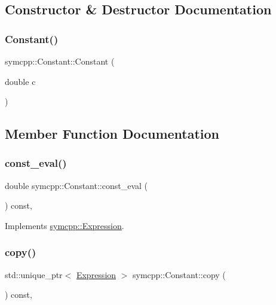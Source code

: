 \subsection{Constructor \& Destructor Documentation}
\mbox{\label{classsymcpp_1_1Constant_a634c91ce129b22e1b9b9afe13d4c8753}} 
\subsubsection{\texorpdfstring{Constant()}{Constant()}}
{\footnotesize\ttfamily symcpp\+::\+Constant\+::\+Constant (\begin{DoxyParamCaption}\item[{double}]{c }\end{DoxyParamCaption})}



\subsection{Member Function Documentation}
\mbox{\label{classsymcpp_1_1Constant_a9c2a9089ae171c2403e053a566929b45}} 
\subsubsection{\texorpdfstring{const\_eval()}{const\_eval()}}
{\footnotesize\ttfamily double symcpp\+::\+Constant\+::const\+\_\+eval (\begin{DoxyParamCaption}{ }\end{DoxyParamCaption}) const\hspace{0.3cm}{\ttfamily [override]}, {\ttfamily [virtual]}}



Implements \mbox{\hyperlink{classsymcpp_1_1Expression_a81c8069347f586cb5632338d97c278ad}{symcpp\+::\+Expression}}.

\mbox{\label{classsymcpp_1_1Constant_aa5a5b0f6f06e6017ed641e8b89cd0cef}} 
\subsubsection{\texorpdfstring{copy()}{copy()}}
{\footnotesize\ttfamily std\+::unique\+\_\+ptr$<$ \mbox{\hyperlink{classsymcpp_1_1Expression}{Expression}} $>$ symcpp\+::\+Constant\+::copy (\begin{DoxyParamCaption}{ }\end{DoxyParamCaption}) const\hspace{0.3cm}{\ttfamily [override]}, {\ttfamily [virtual]}}



